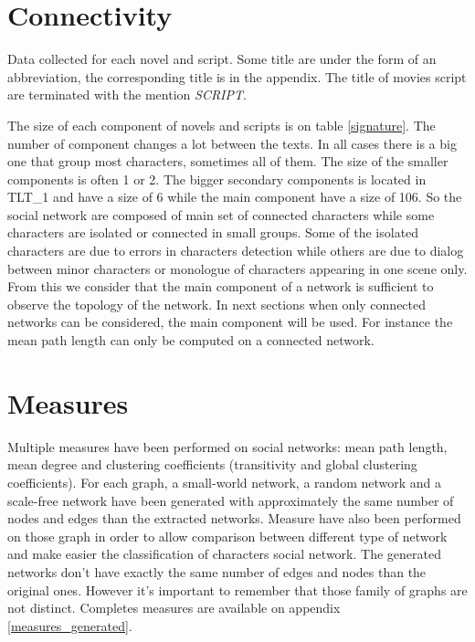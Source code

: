 \documentclass[a4paper, 12pt]{report}
\begin{document}
\section{Connectivity}

\begin{table}[]
\caption{Data collected for each novel and script. Some title are under the form of an abbreviation, the corresponding title
 is in the appendix. The title of movies script are terminated with the mention \textit{SCRIPT}.}
 \label{signature}
\end{table}

The size of each component of novels and scripts is on table \ref{signature}. The number of component changes a lot between the texts. In all cases there is a big one that group most characters, sometimes all of them. The size of the smaller components is often 1 or 2. The bigger secondary components is located in TLT\_1 and have a size of 6 while the main component have a size of 106. So the social network are composed of main set of connected characters while some characters are isolated or connected in small groups. Some of the isolated characters are due to errors in characters detection while others are due to dialog between minor characters or monologue of characters appearing in one scene only. From this we consider that the main component of a network is sufficient to observe the topology of the network. In next sections when only connected networks can be considered, the main component will be used. For instance the mean path length can only be computed on a connected network.


\section{Measures}
Multiple measures have been performed on social networks: mean path length, mean degree and clustering coefficients (transitivity and global clustering coefficients). For each graph, a small-world network, a random network and a scale-free network have been generated with approximately the same number of nodes and edges than the extracted networks. Measure have also been performed on those graph in order to allow comparison between different type of network and make easier the classification of characters social network. The generated networks don't have exactly the same number of edges and nodes than the original ones. However it's important to remember that those family of graphs are not distinct. Completes measures are available on appendix \ref{measures_generated}.\\
\end{document}
